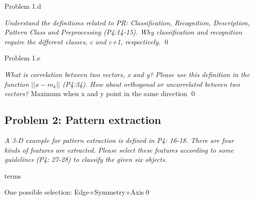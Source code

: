 \documentclass[
        ]{beamer}
\begin{document}
        \begin{frame}[c]{Problem 1.d}
            \begin{overprint}            
            \emph{Understand the definitions related to PR: Classification, Recognition, Description, Pattern Class and Preprocessing (P4:14-15). Why classification and recognition require the different classes, c and c+1, respectively.}        
            	\onslide<2>  %
            	\onslide<3>  %
            		\qed
            \end{overprint}            
        \end{frame}
        
        \begin{frame}[c]{Problem 1.e}
            \begin{overprint}            
            \emph{What is correlation between two vectors, x and y? Please use this definition in the function $||x-m_k||$ (P4:34). How about orthogonal or uncorrelated between two vectors?}
            	\onslide<2> 
            		\alert{Maximum when x and y point in the same direction}
            	\onslide<3>  %
            		\qed
            \end{overprint}            
        \end{frame}
        
    \subsection{Problem 2: Pattern extraction}
        \begin{frame}[c]{\subsecname}
            \emph{A 3-D example for pattern extraction is defined in P4: 16-18. There are four kinds of features are extracted. Please select these features according to some guidelines (P4: 27-28) to classify the given six objects.}
        \end{frame}
        
        \begin{frame}[c]{\subsecname terms}
            \begin{overprint}
            	\onslide<2>  %
            	\onslide<3>  %
            	\onslide<4>  %
            	\onslide<5>  %
            		One possible selection: Edge+Symmetry+Axis\qed
            \end{overprint}   
        \end{frame}
        
\end{document}
